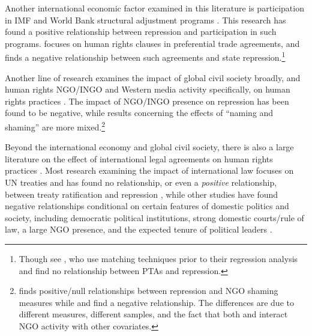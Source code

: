\documentclass[12pt]{article}
\begin{document}
Another international economic factor examined in this literature is participation in IMF and World Bank structural adjustment programs \citep{AbouharbCingranelli2006, AbouharbCingranelli2007}. This research has found a positive relationship between repression and participation in such programs. \citet{HafnerBurton2005io} focuses on human rights clauses in preferential trade agreements, and finds a negative relationship between such agreements and state repression.\footnote{Though see \citet{SpilkerBohmelt2012}, who use matching techniques prior to their regression analysis and find no relationship between PTAs and repression.} 

Another line of research examines the impact of global civil society broadly, and human rights NGO/INGO and Western media activity specifically, on human rights practices \citep{HafnerBurtonTsutsui2005,Franklin2008,HafnerBurton2008,MurdieDavis2012}. The impact of NGO/INGO presence on repression has been found to be negative, while results concerning the effects of ``naming and shaming'' are more mixed.\footnote{\citet{HafnerBurton2008} finds positive/null relationships between repression and NGO shaming measures while \citet{Franklin2008} and \citet{MurdieDavis2012} find a negative relationship. The differences are due to different measures, different samples, and the fact that both \citet{Franklin2008} and \citet{MurdieDavis2012} interact NGO activity with other covariates.} 

Beyond the international economy and global civil society, there is also a large literature on the effect of international legal agreements on human rights practices \citep{Keith1999,Hathaway2002,Neumayer2005,Simmons2009,PowellStaton2009,Hill2010,ConradRitter2013,Lupu2013}. Most research examining the impact of international law focuses on UN treaties and has found no relationship, or even a {\em positive} relationship, between treaty ratification and repression \citep{Keith1999,Hathaway2002,Hill2010}, while other studies have found negative relationships conditional on certain features of domestic politics and society, including democratic political institutions, strong domestic courts/rule of law, a large NGO presence, and the expected tenure of political leaders \citep{Neumayer2005,Simmons2009,ConradRitter2013}. 
\end{document}
